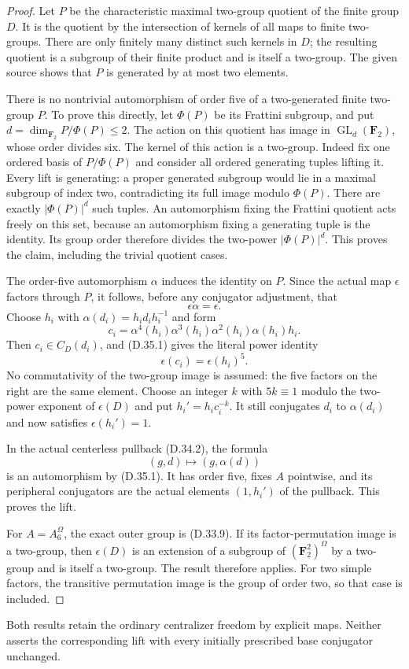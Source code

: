 \begin{proof}
Let $P$ be the characteristic
maximal two-group quotient
of the finite group $D$.
It is the quotient by the
intersection of kernels of
all maps to finite two-groups.
There are only finitely many
distinct such kernels in $D$;
the resulting quotient is a
subgroup of their finite
product and is itself a
two-group.  The given source
shows that $P$ is generated
by at most two elements.

There is no nontrivial
automorphism of order five
of a two-generated finite
two-group $P$.
To prove this directly,
let $\Phi(P)$ be its
Frattini subgroup, and put
$d=\dim_{\mathbf F_2}P/\Phi(P)\leq2$.
The action on this quotient
has image in
$\operatorname{GL}_d(\mathbf F_2)$,
whose order divides six.
The kernel of this action
is a two-group.
Indeed fix one ordered basis
of $P/\Phi(P)$ and consider
all ordered generating tuples
lifting it.  Every lift is
generating: a proper generated
subgroup would lie in a
maximal subgroup of index two,
contradicting its full image
modulo $\Phi(P)$.
There are exactly
$|\Phi(P)|^d$ such tuples.
An automorphism fixing the
Frattini quotient acts freely
on this set, because an
automorphism fixing a
generating tuple is the
identity.  Its group order
therefore divides the
two-power $|\Phi(P)|^d$.
This proves the claim,
including the trivial
quotient cases.

The order-five automorphism
$\alpha$ induces the identity
on $P$.  Since the actual
map $\epsilon$ factors
through $P$, it follows,
before any conjugator
adjustment, that
\[
                         \epsilon\alpha=\epsilon.
 \tag{D.35.1}
\]
Choose $h_i$ with
$\alpha(d_i)=h_i d_i h_i^{-1}$
and form
\[
              c_i=\alpha^4(h_i)\alpha^3(h_i)
                          \alpha^2(h_i)\alpha(h_i)h_i.
 \tag{D.35.2}
\]
Then $c_i\in C_D(d_i)$, and
\textup{(D.35.1)} gives the
literal power identity
\[
                         \epsilon(c_i)=\epsilon(h_i)^5.
 \tag{D.35.3}
\]
No commutativity of the
two-group image is assumed:
the five factors on the
right are the same element.
Choose an integer $k$ with
$5k\equiv1$ modulo the
two-power exponent of
$\epsilon(D)$ and put
$h_i'=h_i c_i^{-k}$.
It still conjugates $d_i$
to $\alpha(d_i)$ and now
satisfies $\epsilon(h_i')=1$.

In the actual centerless
pullback \textup{(D.34.2)},
the formula
\[
                     (g,d)\longmapsto(g,\alpha(d))
 \tag{D.35.4}
\]
is an automorphism by
\textup{(D.35.1)}.
It has order five, fixes
$A$ pointwise, and its
peripheral conjugators are
the actual elements
$(1,h_i')$ of the pullback.
This proves the lift.

For $A=A_6^\Omega$, the
exact outer group is
\textup{(D.33.9)}.
If its factor-permutation
image is a two-group,
then $\epsilon(D)$ is an
extension of a subgroup
of $(\mathbf F_2^2)^\Omega$
by a two-group and is
itself a two-group.
The result therefore
applies.  For two simple
factors, the transitive
permutation image is
the group of order two,
so that case is included.
\end{proof}

Both results retain the ordinary
centralizer freedom by explicit
maps.  Neither asserts the
corresponding lift with every
initially prescribed base
conjugator unchanged.
